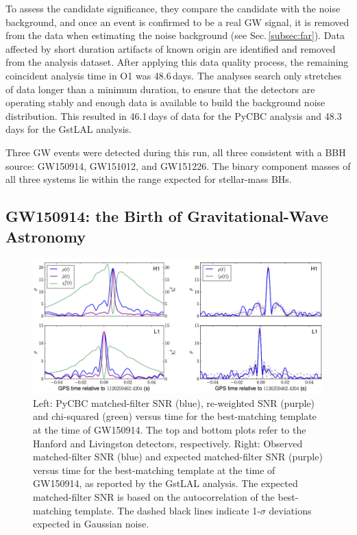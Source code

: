 \documentclass[binding=0.6cm, LaM]{sapthesis}
\begin{document}
	To assess the candidate significance, they compare the candidate with the noise background, 
	and once an event is confirmed to be a real GW signal, 
	it is removed from the data when estimating the noise background (see Sec.\,\ref{subsec:far}).
	Data affected by short duration artifacts of known origin are identified and removed from the analysis dataset.
	After applying this data quality process, the remaining coincident analysis time in O1 was 48.6\,days. 
	The analyses search only stretches of data longer than a minimum duration, 
	to ensure that the detectors are operating stably and enough data is available to build the background noise distribution.  
	This resulted in 46.1\,days of data for the {\ttfamily PyCBC} analysis and 48.3\,days for the {\ttfamily GstLAL} analysis.

	Three GW events were detected during this run, all three consistent with a BBH source: GW150914, GW151012, and GW151226.
	The binary component masses of all three systems lie 
	within the range expected for stellar-mass BHs. 

\subsection{GW150914: the Birth of Gravitational-Wave Astronomy}
\label{subsec:GW150914}
		\begin{figure}[!t]
                	\label{firstgw}
                	\includegraphics[scale=0.7]{firstgw}
                	\centering
                	\caption{Left: {\ttfamily PyCBC} matched-filter SNR (blue), re-weighted SNR (purple) and chi-squared (green) versus time for the best-matching template at the time of GW150914. The top and bottom plots refer to the Hanford and Livingston detectors, respectively. Right: Observed matched-filter SNR (blue) and expected matched-filter SNR (purple) versus time for the best-matching template at the time of GW150914, as reported by the {\ttfamily GstLAL} analysis. The expected matched-filter SNR is based on the autocorrelation of the best-matching template. The dashed black lines indicate 1-$\sigma$ deviations expected in Gaussian noise. \cite{21}} 
                	\label{fig:firstgw}
                \end{figure}
\end{document}
